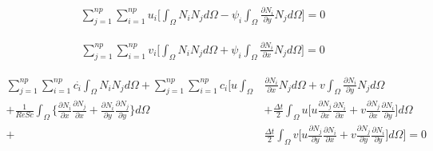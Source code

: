 \begin{equation}
 \begin{aligned}
  \sum\limits_{j=1}^{np}
  \sum\limits_{i=1}^{np} u_i \Bigg[
   \int_{\Omega} N_i N_j d\Omega
 - \psi_i \int_{\Omega} \frac{\partial N_i}{\partial y} N_j d\Omega
  \Bigg] = 0
 \end{aligned}
\end{equation}

\begin{equation}
 \begin{aligned}
  \sum\limits_{j=1}^{np}
  \sum\limits_{i=1}^{np} v_i \Bigg[
   \int_{\Omega} N_i N_j d\Omega
 + \psi_i \int_{\Omega} \frac{\partial N_i}{\partial x} N_j d\Omega
  \Bigg] = 0
 \end{aligned}
\end{equation}

\begin{equation} \label{concentration pre matrix}
\begin{aligned} 
 \sum\limits_{j=1}^{np}
 \sum\limits_{i=1}^{np} \overset{.}{c_i} \int_{\Omega} N_i N_j d\Omega 
  + \sum\limits_{j=1}^{np}
    \sum\limits_{i=1}^{np} c_i  \Bigg[
    u \int_{\Omega} & \frac{\partial N_i}{\partial x} N_j d\Omega 
  + v \int_{\Omega} \frac{\partial N_i}{\partial y} N_j d\Omega
  \\[5pt]
  + \frac{1}{\textit{ReSc}} \int_{\Omega} \Bigg\{ 
                    \frac{\partial N_i}{\partial x} 
                    \frac{\partial N_j}{\partial x} 
  +                 \frac{\partial N_i}{\partial y} 
                    \frac{\partial N_j}{\partial y} 
  \Bigg\} d\Omega 
 & + \frac{\Delta t}{2} \int_{\Omega} u
 \Bigg[
   u \frac{\partial N_j}{\partial x} \frac{\partial N_i}{\partial x}
 + v \frac{\partial N_j}{\partial x} \frac{\partial N_i}{\partial y}
 \Bigg] d\Omega
 \\[5pt]
  + & \frac{\Delta t}{2} \int_{\Omega} v
 \Bigg[
   u \frac{\partial N_j}{\partial y} \frac{\partial N_i}{\partial x}
 + v \frac{\partial N_j}{\partial y} \frac{\partial N_i}{\partial y}
 \Bigg] d\Omega
 \Bigg] = 0
\end{aligned}
\end{equation}




